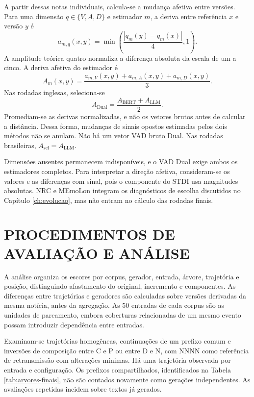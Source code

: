 A partir dessas notas individuais, calcula-se a mudança afetiva entre versões. Para uma dimensão $q\in\{V,A,D\}$ e estimador $m$, a deriva entre referência $x$ e versão $y$ é
\begin{equation}
 a_{m,q}(x,y)=\min\left(\frac{|q_m(y)-q_m(x)|}{4},1\right).
 \label{eq:vad-dimensao}
\end{equation}
A amplitude teórica quatro normaliza a diferença absoluta da escala de um a cinco. A deriva afetiva do estimador é
\begin{equation}
 A_m(x,y)=\frac{a_{m,V}(x,y)+a_{m,A}(x,y)+a_{m,D}(x,y)}{3}.
 \label{eq:vad-estimador}
\end{equation}
Nas rodadas inglesas, seleciona-se
\begin{equation}
 A_{\mathrm{Dual}}=\frac{A_{\mathrm{BERT}}+A_{\mathrm{LLM}}}{2}.
 \label{eq:vad-dual}
\end{equation}
Promediam-se as derivas normalizadas, e não os vetores brutos antes de calcular a distância. Dessa forma, mudanças de sinais opostos estimadas pelos dois métodos não se anulam. Não há um vetor VAD bruto Dual. Nas rodadas brasileiras, $A_{\mathrm{sel}}=A_{\mathrm{LLM}}$.

Dimensões ausentes permanecem indisponíveis, e o VAD Dual exige ambos os estimadores completos. Para interpretar a direção afetiva, consideram-se os valores e as diferenças com sinal, pois o componente do STDI usa magnitudes absolutas. NRC e MEmoLon integram os diagnósticos de escolha discutidos no Capítulo \ref{ch:evolucao}, mas não entram no cálculo das rodadas finais.

\section{PROCEDIMENTOS DE AVALIAÇÃO E ANÁLISE}
\label{sec:metodos-analise}

A análise organiza os escores por corpus, gerador, entrada, árvore, trajetória e posição, distinguindo afastamento do original, incremento e componentes. As diferenças entre trajetórias e geradores são calculadas sobre versões derivadas da mesma notícia, antes da agregação. As 50 entradas de cada corpus são as unidades de pareamento, embora coberturas relacionadas de um mesmo evento possam introduzir dependência entre entradas.

Examinam-se trajetórias homogêneas, continuações de um prefixo comum e inversões de composição entre C e P ou entre D e N, com NNNN como referência de retransmissão com alterações mínimas. Há uma trajetória observada por entrada e configuração. Os prefixos compartilhados, identificados na Tabela \ref{tab:arvores-finais}, não são contados novamente como gerações independentes. As avaliações repetidas incidem sobre textos já gerados.

